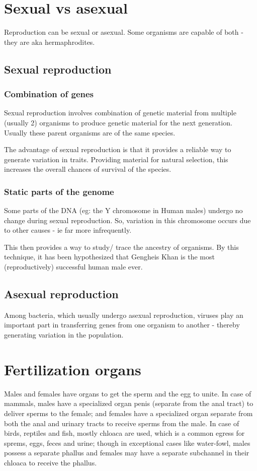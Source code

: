 \documentclass[oneside, article]{memoir}
\begin{document}
\section{Sexual vs asexual}
Reproduction can be sexual or asexual. Some organisms are capable of both - they are aka hermaphrodites.

\subsection{Sexual reproduction}
\subsubsection{Combination of genes}
Sexual reproduction involves combination of genetic material from multiple (usually 2) organisms to produce genetic material for the next generation. Usually these parent organisms are of the same species.

The advantage of sexual reproduction is that it provides a reliable way to generate variation in traits. Providing material for natural selection, this increases the overall chances of survival of the species.

\subsubsection{Static parts of the genome}
Some parts of the DNA (eg: the Y chromosome in Human males) undergo no change during sexual reproduction. So, variation in this chromosome occurs due to other causes - ie far more infrequently.

This then provides a way to study/ trace the ancestry of organisms. By this technique, it has been hypothesized that Gengheis Khan is the most (reproductively) successful human male ever.

\subsection{Asexual reproduction}
Among bacteria, which usually undergo asexual reproduction, viruses play an important part in transferring genes from one organism to another - thereby generating variation in the population.



\section{Fertilization organs}
Males and females have organs to get the sperm and the egg to unite. In case of mammals, males have a specialized organ penis (separate from the anal tract) to deliver sperms to the female; and females have a specialized organ separate from both the anal and urinary tracts to receive sperms from the male. In case of birds, reptiles and fish, mostly chloaca are used, which is a common egress for sprems, eggs, feces and urine; though in exceptional cases like water-fowl, males possess a separate phallus and females may have a separate subchannel in their chloaca to receive the phallus.
\end{document}
